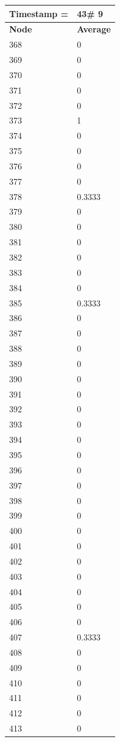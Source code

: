 \begin{tabular}{|l||l|}
\hline
\textbf{Timestamp =} & \textbf{43}\# 9\\\hline
	\textbf{Node} & \textbf{Average} \\ \hline
\hline
	368 & 0 \\ \hline
	369 & 0 \\ \hline
	370 & 0 \\ \hline
	371 & 0 \\ \hline
	372 & 0 \\ \hline
	373 & 1 \\ \hline
	374 & 0 \\ \hline
	375 & 0 \\ \hline
	376 & 0 \\ \hline
	377 & 0 \\ \hline
	378 & 0.3333 \\ \hline
	379 & 0 \\ \hline
	380 & 0 \\ \hline
	381 & 0 \\ \hline
	382 & 0 \\ \hline
	383 & 0 \\ \hline
	384 & 0 \\ \hline
	385 & 0.3333 \\ \hline
	386 & 0 \\ \hline
	387 & 0 \\ \hline
	388 & 0 \\ \hline
	389 & 0 \\ \hline
	390 & 0 \\ \hline
	391 & 0 \\ \hline
	392 & 0 \\ \hline
	393 & 0 \\ \hline
	394 & 0 \\ \hline
	395 & 0 \\ \hline
	396 & 0 \\ \hline
	397 & 0 \\ \hline
	398 & 0 \\ \hline
	399 & 0 \\ \hline
	400 & 0 \\ \hline
	401 & 0 \\ \hline
	402 & 0 \\ \hline
	403 & 0 \\ \hline
	404 & 0 \\ \hline
	405 & 0 \\ \hline
	406 & 0 \\ \hline
	407 & 0.3333 \\ \hline
	408 & 0 \\ \hline
	409 & 0 \\ \hline
	410 & 0 \\ \hline
	411 & 0 \\ \hline
	412 & 0 \\ \hline
	413 & 0 \\ \hline
\end{tabular}

